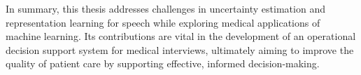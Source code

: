 In summary, this thesis addresses challenges in uncertainty estimation and representation learning for speech while exploring medical applications of machine learning.
Its contributions are vital in the development of an operational decision support system for medical interviews, ultimately aiming to improve the quality of patient care by supporting effective, informed decision-making.
